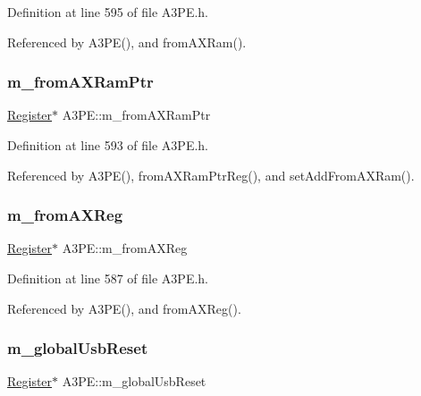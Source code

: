 Definition at line 595 of file A3\+P\+E.\+h.



Referenced by A3\+P\+E(), and from\+A\+X\+Ram().

\mbox{\label{classA3PE_a27ae9467bc128e46dd80443245df096a}} 
\subsubsection{\texorpdfstring{m\+\_\+from\+A\+X\+Ram\+Ptr}{m\_fromAXRamPtr}}
{\footnotesize\ttfamily \hyperlink{classRegister}{Register}$\ast$ A3\+P\+E\+::m\+\_\+from\+A\+X\+Ram\+Ptr\hspace{0.3cm}{\ttfamily [private]}}



Definition at line 593 of file A3\+P\+E.\+h.



Referenced by A3\+P\+E(), from\+A\+X\+Ram\+Ptr\+Reg(), and set\+Add\+From\+A\+X\+Ram().

\mbox{\label{classA3PE_acbfe708ac0a81243959c96124f192b9e}} 
\subsubsection{\texorpdfstring{m\+\_\+from\+A\+X\+Reg}{m\_fromAXReg}}
{\footnotesize\ttfamily \hyperlink{classRegister}{Register}$\ast$ A3\+P\+E\+::m\+\_\+from\+A\+X\+Reg\hspace{0.3cm}{\ttfamily [private]}}



Definition at line 587 of file A3\+P\+E.\+h.



Referenced by A3\+P\+E(), and from\+A\+X\+Reg().

\mbox{\label{classA3PE_abd71e0c273f9e211e1a9302019129aff}} 
\subsubsection{\texorpdfstring{m\+\_\+global\+Usb\+Reset}{m\_globalUsbReset}}
{\footnotesize\ttfamily \hyperlink{classRegister}{Register}$\ast$ A3\+P\+E\+::m\+\_\+global\+Usb\+Reset\hspace{0.3cm}{\ttfamily [private]}}



